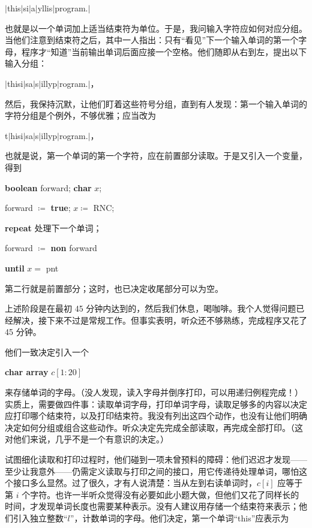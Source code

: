 \documentclass[twoside,11pt,fontset=none]{ctexbook}
\begin{document}
\quad $\mid$this\textendash $\mid$si\textendash $\mid$a\textendash $\mid$yllis\textendash $\mid$program.$\mid$

\noindent
也就是以一个单词加上适当结束符为单位。于是，我问输入字符应如何对应分组。当他们注意到结束符之后，其中一人指出：只有“看见”下一个输入单词的第一个字母，程序才“知道”当前输出单词后面应接一个空格。他们随即从右到左，提出以下输入分组：

\quad $\mid$this\textemdash{}i$\mid$s\textemdash{}a$\mid$\textemdash{}s$\mid$illy\textemdash{}p$\mid$rogram\textemdash{}.$\mid$，

\noindent
然后，我保持沉默，让他们盯着这些符号分组，直到有人发现：第一个输入单词的字符分组是个例外，不够优雅；应当改为

\quad t$\mid$his\textemdash{}i$\mid$s\textemdash{}a$\mid$\textemdash{}s$\mid$illy\textemdash{}p$\mid$rogram\textemdash{}.$\mid$，

\noindent
也就是说，第一个单词的第一个字符，应在前置部分读取。于是又引入一个变量，得到

\quad \textbf{boolean} forward; \textbf{char} $x$;

\quad forward $\coloneq$ \textbf{true}; $x \coloneq$ RNC;

\quad \textbf{repeat} 处理下一个单词；

\quad \quad forward $\coloneq$ \textbf{non} forward

\quad \textbf{until} $x =$ pnt

\noindent
第二行就是前置部分；这时，也已决定收尾部分可以为空。

上述阶段是在最初 45 分钟内达到的，然后我们休息，喝咖啡。我个人觉得问题已经解决，接下来不过是常规工作。但事实表明，听众还不够熟练，完成程序又花了 45 分钟。

他们一致决定引入一个

\quad \textbf{char array} $c[1:20]$

\noindent
来存储单词的字母。（没人发现，读入字母并倒序打印，可以用递归例程完成！）实质上，需要做四件事：读取单词字母，打印单词字母，读取足够多的内容以决定应打印哪个结束符，以及打印结束符。我没有列出这四个动作，也没有让他们明确决定如何分组或组合这些动作。听众决定先完成全部读取，再完成全部打印。（这对他们来说，几乎不是一个有意识的决定。）

试图细化读取和打印过程时，他们碰到一项未曾预料的障碍：他们迟迟才发现——至少让我意外——仍需定义读取与打印之间的接口，用它传递待处理单词，哪怕这个接口多么显然。过了很久，才有人说清楚：当从左到右读单词时，$c[i]$ 应等于第 $i$ 个字符。也许一半听众觉得没有必要如此小题大做，但他们又花了同样长的时间，才发现单词长度也需要某种表示。没有人建议用存储一个结束符来表示；他们引入独立整数“$l$”，计数单词的字母。他们决定，第一个单词“this”应表示为
\end{document}
